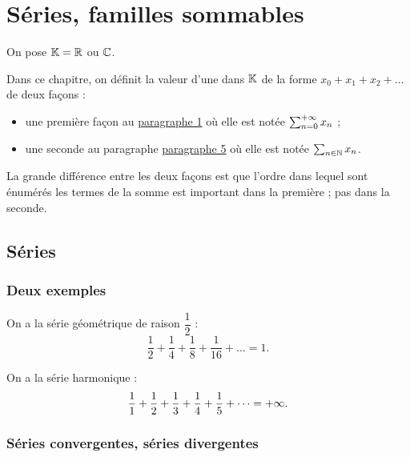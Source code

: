 \chapter{Séries, familles sommables}

\minitoc

On pose \(\mathbb{K}=\mathbb{R}\) ou \(\mathbb{C}\).

Dans ce chapitre, on définit la valeur d'une  dans \(\mathbb{K}\) de la forme \(x_0+x_1+x_2+\dots\) de deux façons :

\begin{itemize}
    \item une première façon au \hyperref[sec:séries]{paragraphe 1} où elle est notée \(\sum_{n=0}^{+\infty}x_n\) ; \\
    \item une seconde au paragraphe \hyperref[sec:famillesSommablesDeRéelsPositifs]{paragraphe 5} où elle est notée \(\sum_{n\in\mathbb{N}}x_n\).
\end{itemize}

La grande différence entre les deux façons est que l'ordre dans lequel sont énumérés les termes de la somme est important dans la première ; pas dans la seconde.

\section{Séries}\label{sec:séries}

\subsection{Deux exemples}

\begin{ex}
On a la série géométrique de raison \(\dfrac{1}{2}\) : \[\dfrac{1}{2}+\dfrac{1}{4}+\dfrac{1}{8}+\dfrac{1}{16}+\dots=1.\]
\end{ex}

\begin{ex}
On a la série harmonique : \[\dfrac{1}{1}+\dfrac{1}{2}+\dfrac{1}{3}+\dfrac{1}{4}+\dfrac{1}{5}+\dots=+\infty.\]
\end{ex}

\subsection{Séries convergentes, séries divergentes}

